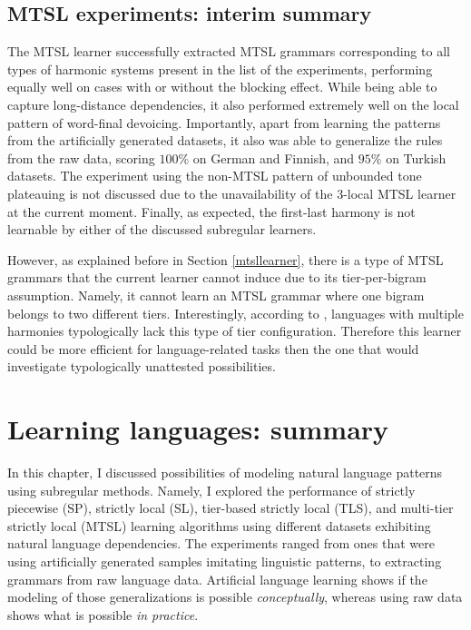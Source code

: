 \subsection{MTSL experiments: interim summary}

The MTSL learner successfully extracted MTSL grammars corresponding to all types of harmonic systems present in the list of the experiments, performing equally well on cases with or without the blocking effect.
While being able to capture long-distance dependencies, it also performed extremely well on the local pattern of word-final devoicing.
Importantly, apart from learning the patterns from the artificially generated datasets, it also was able to generalize the rules from the raw data, scoring $100$\% on German and Finnish, and $95$\% on Turkish datasets.
The experiment using the non-MTSL pattern of unbounded tone plateauing is not discussed due to the unavailability of the $3$-local MTSL learner at the current moment.
Finally, as expected, the first-last harmony is not learnable by either of the discussed subregular learners.


However, as explained before in Section \ref{mtsllearner}, there is a type of MTSL grammars that the current learner cannot induce due to its tier-per-bigram assumption.
Namely, it cannot learn an MTSL grammar where one bigram belongs to two different tiers.
Interestingly, according to \cite{AksenovaDeshmukh2018}, languages with multiple harmonies typologically lack this type of tier configuration.
Therefore this learner could be more efficient for language-related tasks then the one that would investigate typologically unattested possibilities.


\section{Learning languages: summary}
\label{interimsummarylanguages}

In this chapter, I discussed possibilities of modeling natural language patterns using subregular methods.
Namely, I explored the performance of strictly piecewise (SP), strictly local (SL), tier-based strictly local (TLS), and multi-tier strictly local (MTSL) learning algorithms using different datasets exhibiting natural language dependencies.
The experiments ranged from ones that were using artificially generated samples imitating linguistic patterns, to extracting grammars from raw language data.
Artificial language learning shows if the modeling of those generalizations is possible \emph{conceptually}, whereas using raw data shows what is possible \emph{in practice}.

